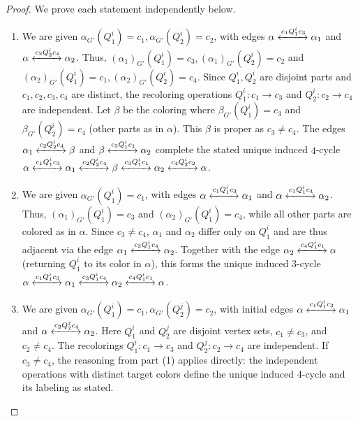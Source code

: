 \documentclass[10pt,a4paper]{amsart}
\begin{document}
\begin{proof}
We prove each statement independently below.
\begin{enumerate}
    \item We are given $\alpha_{G'}(Q^i_1)=c_1, \alpha_{G'}(Q^i_2)=c_2$, with edges $\alpha \xleftrightarrow{c_1Q^i_1c_3} \alpha_1$ and $\alpha \xleftrightarrow{c_2Q^i_2c_4} \alpha_2$. Thus, $(\alpha_1)_{G'}(Q^i_1)=c_3, (\alpha_1)_{G'}(Q^i_2)=c_2$ and $(\alpha_2)_{G'}(Q^i_1)=c_1, (\alpha_2)_{G'}(Q^i_2)=c_4$.
    Since $Q^i_1, Q^i_2$ are disjoint parts and $c_1,c_2,c_3,c_4$ are distinct, the recoloring operations $Q^i_1\colon c_1 \to c_3$ and $Q^i_2\colon c_2 \to c_4$ are independent. Let $\beta$ be the coloring where $\beta_{G'}(Q^i_1)=c_3$ and $\beta_{G'}(Q^i_2)=c_4$ (other parts as in $\alpha$). This $\beta$ is proper as $c_3 \neq c_4$. The edges $\alpha_1 \xleftrightarrow{c_2Q^i_2c_4} \beta$ and $\beta \xleftrightarrow{c_3Q^i_1c_1} \alpha_2$ complete the stated unique induced $4$-cycle $\alpha \xleftrightarrow{c_1Q^i_1c_3} \alpha_1 \xleftrightarrow{c_2Q^i_2c_4} \beta \xleftrightarrow{c_3Q^i_1c_1} \alpha_2 \xleftrightarrow{c_4Q^i_2c_2} \alpha$.
    \item  We are given $\alpha_{G'}(Q^i_1)=c_1$, with edges $\alpha \xleftrightarrow{c_1Q^i_1c_3} \alpha_1$ and $\alpha \xleftrightarrow{c_1Q^i_1c_4} \alpha_2$. Thus, $(\alpha_1)_{G'}(Q^i_1)=c_3$ and $(\alpha_2)_{G'}(Q^i_1)=c_4$, while all other parts are colored as in $\alpha$. Since $c_3 \neq c_4$, $\alpha_1$ and $\alpha_2$ differ only on $Q^i_1$ and are thus adjacent via the edge $\alpha_1 \xleftrightarrow{c_3Q^i_1c_4} \alpha_2$. Together with the edge $\alpha_2 \xleftrightarrow{c_4Q^i_1c_1} \alpha$ (returning $Q^i_1$ to its color in $\alpha$), this forms the unique induced $3$-cycle $\alpha \xleftrightarrow{c_1Q^i_1c_3} \alpha_1 \xleftrightarrow{c_3Q^i_1c_4} \alpha_2 \xleftrightarrow{c_4Q^i_1c_1} \alpha$.
    \item We are given $\alpha_{G'}(Q^i_1)=c_1, \alpha_{G'}(Q^j_2)=c_2$, with initial edges $\alpha \xleftrightarrow{c_1Q^i_1c_3} \alpha_1$ and $\alpha \xleftrightarrow{c_2Q^j_2c_4} \alpha_2$. Here $Q^i_1$ and $Q^j_2$ are disjoint vertex sets, $c_1 \neq c_3$, and $c_2 \neq c_4$. The recolorings $Q^i_1\colon c_1 \to c_3$ and $Q^j_2\colon c_2 \to c_4$ are independent. If $c_3 \neq c_4$, the reasoning from part (1) applies directly: the independent operations with distinct target colors define the unique induced 4-cycle and its labeling as stated.
    

\end{enumerate}
\end{proof}
\end{document}

